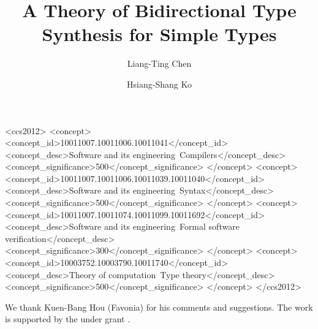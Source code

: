 \documentclass[acmsmall,screen,review,anonymous,draft]{acmart}
\author{Liang-Ting Chen}
\author{Hsiang-Shang Ko}
\affiliation{%
  \institution{Academia Sinica}
  \streetaddress{128 Academia Road}
  \city{Taipei}
  \country{Taiwan}
  \postcode{115}
}
\title{A Theory of Bidirectional Type Synthesis for Simple Types}
\theoremstyle{acmdefinition}
\begin{document}
\begin{CCSXML}
<ccs2012>
   <concept>
       <concept_id>10011007.10011006.10011041</concept_id>
       <concept_desc>Software and its engineering~Compilers</concept_desc>
       <concept_significance>500</concept_significance>
       </concept>
   <concept>
       <concept_id>10011007.10011006.10011039.10011040</concept_id>
       <concept_desc>Software and its engineering~Syntax</concept_desc>
       <concept_significance>500</concept_significance>
       </concept>
   <concept>
       <concept_id>10011007.10011074.10011099.10011692</concept_id>
       <concept_desc>Software and its engineering~Formal software verification</concept_desc>
       <concept_significance>300</concept_significance>
       </concept>
   <concept>
       <concept_id>10003752.10003790.10011740</concept_id>
       <concept_desc>Theory of computation~Type theory</concept_desc>
       <concept_significance>500</concept_significance>
       </concept>
 </ccs2012>
\end{CCSXML}



\maketitle









\begin{acks}
We thank Kuen-Bang {Hou (Favonia)} for his comments and suggestions.
The work is supported by the  under grant .
\end{acks}



\end{document}
